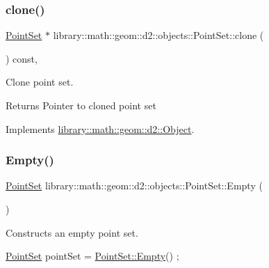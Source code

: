 \subsubsection{\texorpdfstring{clone()}{clone()}}
{\footnotesize\ttfamily \hyperlink{classlibrary_1_1math_1_1geom_1_1d2_1_1objects_1_1_point_set}{Point\+Set} $\ast$ library\+::math\+::geom\+::d2\+::objects\+::\+Point\+Set\+::clone (\begin{DoxyParamCaption}{ }\end{DoxyParamCaption}) const\hspace{0.3cm}{\ttfamily [override]}, {\ttfamily [virtual]}}



Clone point set. 

\begin{DoxyReturn}{Returns}
Pointer to cloned point set 
\end{DoxyReturn}


Implements \hyperlink{classlibrary_1_1math_1_1geom_1_1d2_1_1_object_a5c26ae4120edb24f6463d65a9cef247d}{library\+::math\+::geom\+::d2\+::\+Object}.

\mbox{\label{classlibrary_1_1math_1_1geom_1_1d2_1_1objects_1_1_point_set_af09fa6d8bce9f64b150c739e1ed7bfc6}} 
\subsubsection{\texorpdfstring{Empty()}{Empty()}}
{\footnotesize\ttfamily \hyperlink{classlibrary_1_1math_1_1geom_1_1d2_1_1objects_1_1_point_set}{Point\+Set} library\+::math\+::geom\+::d2\+::objects\+::\+Point\+Set\+::\+Empty (\begin{DoxyParamCaption}{ }\end{DoxyParamCaption})\hspace{0.3cm}{\ttfamily [static]}}



Constructs an empty point set. 


\begin{DoxyCode}
\hyperlink{classlibrary_1_1math_1_1geom_1_1d2_1_1objects_1_1_point_set_a1b27139683b5b3418188e3eae1385618}{PointSet} pointSet = \hyperlink{classlibrary_1_1math_1_1geom_1_1d2_1_1objects_1_1_point_set_af09fa6d8bce9f64b150c739e1ed7bfc6}{PointSet::Empty}() ;
\end{DoxyCode}


